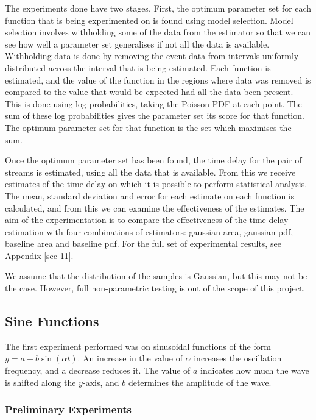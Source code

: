 \documentclass[a4paper,11pt]{article}
\begin{document}
The experiments done have two stages. First, the optimum parameter set for each
function that is being experimented on is found using model selection. Model
selection involves withholding some of the data from the estimator so that we
can see how well a parameter set generalises if not all the data is
available. Withholding data is done by removing the event data from intervals
uniformly distributed across the interval that is being estimated. Each function
is estimated, and the value of the function in the regions where data was
removed is compared to the value that would be expected had all the data been
present. This is done using log probabilities, taking the Poisson PDF at each
point. The sum of these log probabilities gives the parameter set its score for
that function. The optimum parameter set for that function is the set which
maximises the sum.

Once the optimum parameter set has been found, the time delay
for the pair of streams is estimated, using all the data that is available. From
this we receive estimates of the time delay on which it is possible to perform
statistical analysis. The mean, standard deviation and error for each estimate
on each function is calculated, and from this we can examine the effectiveness
of the estimates. The aim of the experimentation is to compare the effectiveness
of the time delay estimation with four combinations of estimators: gaussian
area, gaussian pdf, baseline area and baseline pdf. For the full set of
experimental results, see Appendix \ref{sec-11}.

We assume that the distribution of the samples is Gaussian, but this may not be
the case. However, full non-parametric testing is out of the scope of this project.
\subsection{Sine Functions}
\label{sec-7-1}

The first experiment performed was on sinusoidal functions of the form
$y=a-b\sin(\alpha t)$. An increase in the value of $\alpha$ increases the
oscillation frequency, and a decrease reduces it. The value of $a$ indicates how
much the wave is shifted along the $y$-axis, and $b$ determines the
amplitude of the wave.
\subsubsection{Preliminary Experiments}
\label{sec-7-1-1}
\end{document}
